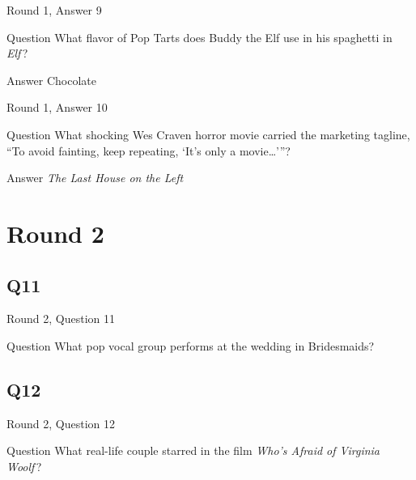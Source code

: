 \documentclass[11pt]{beamer}
\begin{document}
\begin{frame}[t]{Round 1, Answer 9}
\vspace{2em}
\begin{block}{Question}
What flavor of Pop Tarts does Buddy the Elf use in his spaghetti in \emph{Elf}\,?
\end{block}
\pause{}
\begin{block}{Answer}
Chocolate
\end{block}
\end{frame}
    

\begin{frame}[t]{Round 1, Answer 10}
\vspace{2em}
\begin{block}{Question}
What shocking Wes Craven horror movie carried the marketing tagline, ``To avoid fainting, keep repeating, `It's only a movie…'{}''?
\end{block}
\pause{}
\begin{block}{Answer}
\emph{The Last House on the Left}
\end{block}
\end{frame}
    

\section{Round 2}
    

\subsection*{Q11}
\begin{frame}[t]{Round 2, Question 11}
\vspace{2em}
\begin{block}{Question}
What pop vocal group performs at the wedding in Bridesmaids?
\end{block}
\end{frame}
    

\subsection*{Q12}
\begin{frame}[t]{Round 2, Question 12}
\vspace{2em}
\begin{block}{Question}
What real-life couple starred in the film \emph{Who's Afraid of Virginia Woolf}\,?
\end{block}
\end{frame}
    
\end{document}
